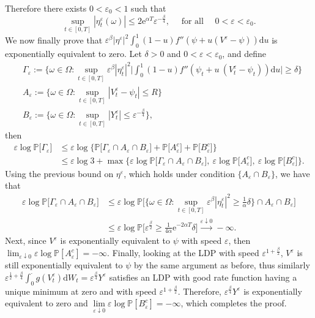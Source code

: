\documentclass{amsart}[11pt]
\numberwithin{equation}{section}
\numberwithin{theorem}{subsection}
\numberwithin{proposition}{subsection}
\numberwithin{definition}{subsection}
\numberwithin{lemma}{subsection}
\numberwithin{assumption}{subsection}
\newcommand{\PP}{\mathbb{P}}
\newcommand{\D}{\mathrm{d}}
\newcommand{\E}{\mathrm{e}}
\newcommand{\eps}{\varepsilon}
\begin{document}
Therefore there exists $0<\eps_0<1$ such that
\[
\sup_{t \in [0,T]}|\eta_{t}^\eps(\omega)|\leq 2\E^{\alpha T}\eps^{-\frac{\beta}{4}},
\quad \text{ for all } \quad 0 < \eps <\eps_0.
\]
We now finally prove that $\eps^\beta |\eta^\eps|^2 \int_0^1 (1-u)f''(\psi + u (V^\eps - \psi))\D u$ is exponentially equivalent to zero.
Let $\delta >0$ and $0<\eps<\eps_0$, and define
\begin{align*}
&\Gamma_\eps := \Big\{\omega\in\Omega : \sup_{t \in [0,T]}\eps^\beta |\eta_{t}^\eps|^2 \Big|\int_0^1 (1-u)f''(\psi_t + u\ (V^{\eps}_{t} - \psi_t))\D u\Big|\geq \delta\Big\} \\
&A_\eps := \Big\{\omega\in\Omega : \sup_{t \in [0,T]}|V^\eps_t - \psi_t|\leq  R \Big\} \\
&B_\eps := \Big\{\omega\in\Omega : \sup_{t\in[0,T]}|Y_t^\eps|\leq \eps^{-\frac{\beta}{4}}\Big\},
\end{align*}
then
\begin{align*}
\eps\log\PP\Big[\Gamma_\eps\Big]
&\leq \eps\log \Big\{ \PP\Big[\Gamma_\eps \cap A_\eps \cap B_\eps\Big] + \PP\Big[A_\eps^c \Big] + \PP\Big[B_\eps^c   \Big]\Big\} \\
&\leq \eps\log3 + \max \Big \{ \eps\log \PP\Big[\Gamma_\eps \cap A_\eps \cap B_\eps\Big], \  \eps\log \PP\Big[A_\eps^c \Big], \  \eps\log \PP\Big[B_\eps^c \Big] \Big\}.
\end{align*}
Using the previous bound on $\eta^\eps$, which holds under condition $\{A_\eps\cap B_\eps\}$, we have that
\begin{align*}
\eps\log \PP\Big[\Gamma_\eps \cap A_\eps \cap B_\eps\Big]
&\leq \eps\log \PP\Big[\Big\{\omega\in\Omega : \sup_{t \in [0,T]}\eps^\beta |\eta_{t}^\eps|^2\geq \frac{1}{\alpha}\delta\Big\} \cap A_\eps \cap B_\eps\Big] \\
&\leq \eps\log \PP\Big[\eps^{\frac{\beta}{2}}\geq \frac{1}{4\alpha}\E^{-2\alpha T}\delta \Big]
\xrightarrow{\eps \downarrow 0}-\infty.
\end{align*}
Next, since $V^\eps$ is exponentially equivalent to $\psi$ with speed $\eps$, then $\lim_{\eps\downarrow 0}\eps\log \PP[A_\eps^c] = -\infty$. Finally, looking at the LDP with speed $\eps^{1 + \frac{\beta}{2}}$, $V^\eps$ is still  exponentially equivalent to $\psi$ by the same argument as before, thus similarly $\eps^{\frac{1}{2} + \frac{\beta}{4}}\int_{0}^{\cdot} g(V^\eps_t)\D W_t = \eps^{\frac{\beta}{4}}Y^\eps$ satisfies an LDP with good rate function having a unique minimum at zero and with speed $\eps^{1 + \frac{\beta}{2}}$. Therefore, $\eps^{\frac{\beta}{4}}Y^\eps$ is exponentially equivalent to zero and
$\lim\limits_{\eps\downarrow 0}\eps \log \PP[B_\eps^c] = -\infty$, which completes the proof.
\end{document}
